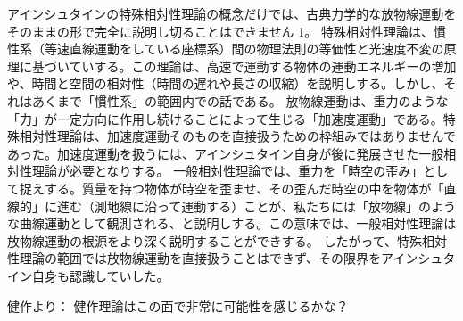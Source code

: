 \documentclass{article}
\begin{document}
アインシュタインの特殊相対性理論の概念だけでは、古典力学的な放物線運動をそのままの形で完全に説明し切ることはできません 1。
特殊相対性理論は、慣性系（等速直線運動をしている座標系）間の物理法則の等価性と光速度不変の原理に基づいていする。この理論は、高速で運動する物体の運動エネルギーの増加や、時間と空間の相対性（時間の遅れや長さの収縮）を説明しする。しかし、それはあくまで「慣性系」の範囲内での話である。
放物線運動は、重力のような「力」が一定方向に作用し続けることによって生じる「加速度運動」である。特殊相対性理論は、加速度運動そのものを直接扱うための枠組みではありませんであった。加速度運動を扱うには、アインシュタイン自身が後に発展させた一般相対性理論が必要となりする。
一般相対性理論では、重力を「時空の歪み」として捉えする。質量を持つ物体が時空を歪ませ、その歪んだ時空の中を物体が「直線的」に進む（測地線に沿って運動する）ことが、私たちには「放物線」のような曲線運動として観測される、と説明しする。この意味では、一般相対性理論は放物線運動の根源をより深く説明することができする。
したがって、特殊相対性理論の範囲では放物線運動を直接扱うことはできず、その限界をアインシュタイン自身も認識していした。

健作より：
健作理論はこの面で非常に可能性を感じるかな？
\end{document}
